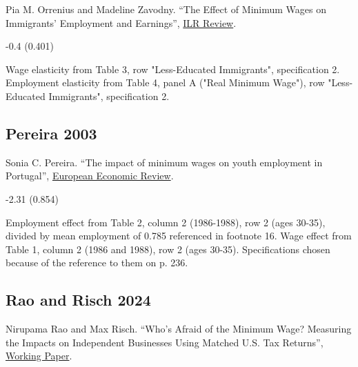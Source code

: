 \noindent Pia M. Orrenius and Madeline Zavodny. ``The Effect of Minimum Wages on Immigrants' Employment and Earnings'', \href{https://doi.org/10.1177/001979390806100406}{ILR Review}.

\vspace{0.7em}

 -0.4 (0.401)

\vspace{0.7em}

 Wage elasticity from Table 3, row "Less-Educated Immigrants", specification 2. Employment elasticity from Table 4, panel A ("Real Minimum Wage"), row "Less-Educated Immigrants", specification 2.

\subsection*{Pereira 2003}
\vspace{-0.7em}

\noindent Sonia C. Pereira. ``The impact of minimum wages on youth employment in Portugal'', \href{https://doi.org/10.1016/S0014-2921(02)00209-X}{European Economic Review}.

\vspace{0.7em}

 -2.31 (0.854)

\vspace{0.7em}

 Employment effect from Table 2, column 2 (1986-1988), row 2 (ages 30-35), divided by mean employment of 0.785 referenced in footnote 16. Wage effect from Table 1, column 2 (1986 and 1988), row 2 (ages 30-35). Specifications chosen because of the reference to them on p. 236.

\subsection*{Rao and Risch 2024}
\vspace{-0.7em}

\noindent Nirupama Rao and Max Risch. ``Who's Afraid of the Minimum Wage? Measuring the Impacts on Independent Businesses Using Matched U.S. Tax Returns'', \href{https://www.nirupamarao.org/_files/ugd/ed3ee5_5b251b066aa74388917e8024285973db.pdf}{Working Paper}.

\vspace{0.7em}

